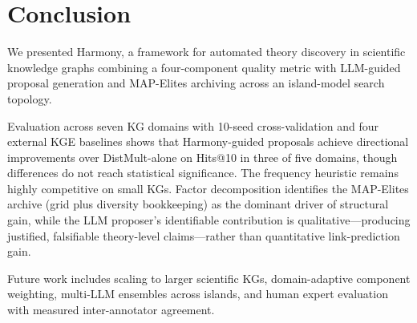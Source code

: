 \section{Conclusion}\label{sec:conclusion}

We presented Harmony, a framework for automated theory discovery in scientific
knowledge graphs combining a four-component quality metric with LLM-guided
proposal generation and MAP-Elites archiving across an island-model search
topology.

Evaluation across seven KG domains with 10-seed cross-validation and four
external KGE baselines shows that Harmony-guided proposals achieve directional
improvements over DistMult-alone on Hits@10 in three of five domains, though
differences do not reach statistical significance.  The frequency heuristic
remains highly competitive on small KGs.  Factor decomposition identifies the
MAP-Elites archive (grid plus diversity bookkeeping) as the dominant
driver of structural gain, while the LLM proposer's identifiable
contribution is qualitative---producing justified, falsifiable
theory-level claims---rather than quantitative link-prediction gain.

Future work includes scaling to larger scientific KGs, domain-adaptive
component weighting, multi-LLM ensembles across islands, and human expert
evaluation with measured inter-annotator agreement.
